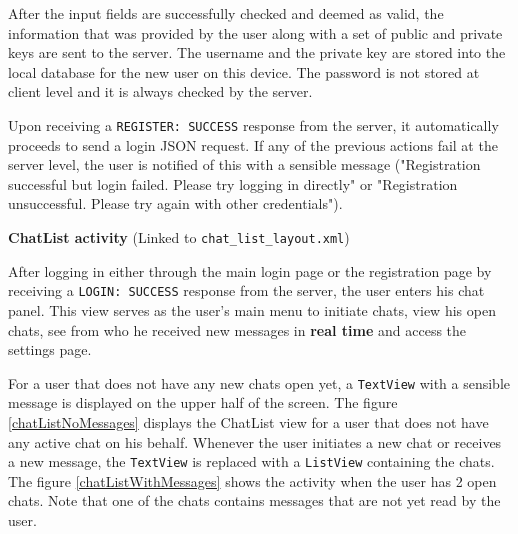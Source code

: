 After the input fields are successfully checked and deemed as valid, the information that was provided by the user along with a set of public and private keys are sent to the server. The username and the private key are stored into the local database for the new user on this device. The password is not stored at client level and it is always checked by the server.

Upon receiving a \verb|REGISTER: SUCCESS| response from the server, it automatically proceeds to send a login JSON request. If any of the previous actions fail at the server level, the user is notified of this with a sensible message ("Registration successful but login failed. Please try logging in directly" or "Registration unsuccessful. Please try again with other credentials").

\textbf{ChatList activity} (Linked to \verb|chat_list_layout.xml|)

After logging in either through the main login page or the registration page by receiving a \verb|LOGIN: SUCCESS| response from the server, the user enters his chat panel. This view serves as the user's main menu to initiate chats, view his open chats, see from who he received new messages in \textbf{real time} and access the settings page.

For a user that does not have any new chats open yet, a \verb|TextView| with a sensible message is displayed on the upper half of the screen. The figure \ref{chatListNoMessages} displays the ChatList view for a user that does not have any active chat on his behalf. Whenever the user initiates a new chat or receives a new message, the \verb|TextView| is replaced with a \verb|ListView| containing the chats. The figure \ref{chatListWithMessages} shows the activity when the user has 2 open chats. Note that one of the chats contains messages that are not yet read by the user.


